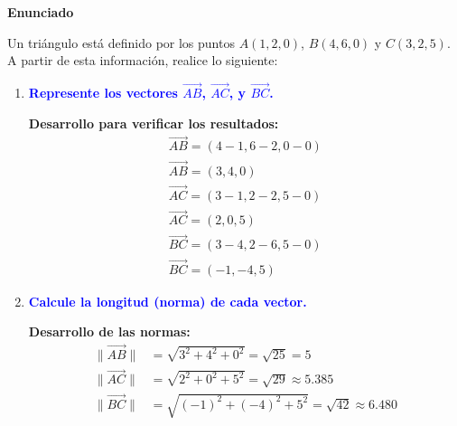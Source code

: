 
\begin{center}
\colorbox{gray!10}{\parbox{0.95\textwidth}{
\vspace{0.3cm}
\centering
\textbf{\large Enunciado}
\vspace{0.2cm}

\begin{minipage}{0.9\textwidth}
Un triángulo está definido por los puntos $A(1,2,0)$, $B(4,6,0)$ y $C(3,2,5)$. A partir de esta información, realice lo siguiente:
\end{minipage}
\vspace{0.3cm}
}}
\end{center}

\begin{enumerate}[label=\textbf{\arabic*.}, itemsep=1em, leftmargin=2em]
    \item \textcolor{blue}{\textbf{Represente los vectores $\overrightarrow{AB}$, $\overrightarrow{AC}$, y $\overrightarrow{BC}$.}}

    \begin{center}
    \colorbox{blue!5}{\begin{minipage}{0.9\textwidth}
    \vspace{0.3cm}
    \textbf{Desarrollo para verificar los resultados:}
    \begin{gather*}
        \overrightarrow{AB} = (4-1,  6-2, 0-0) \\
        \overrightarrow{AB} = \boxed{(3, 4, 0)} \\[0.5em]
        \overrightarrow{AC} = (3-1,  2-2,  5-0) \\
        \overrightarrow{AC} = \boxed{(2, 0, 5)} \\[0.5em]
        \overrightarrow{BC} = (3-4,2-6,5-0) \\
        \overrightarrow{BC} = \boxed{(-1, -4, 5)}
    \end{gather*}
    \vspace{0.2cm}
    \end{minipage}}
    \end{center}
    
    \item \textcolor{blue}{\textbf{Calcule la longitud (norma) de cada vector.}}
    
    \begin{center}
    \colorbox{green!5}{\begin{minipage}{0.9\textwidth}
    \vspace{0.3cm}
    \textbf{Desarrollo de las normas:}
    \begin{align*}
        \|\vec{AB}\| &= \sqrt{3^2 + 4^2 + 0^2} = \sqrt{25} = \boxed{5} \\[0.8em]
        \|\vec{AC}\| &= \sqrt{2^2 + 0^2 + 5^2} = \sqrt{29} \approx \boxed{5.385} \\[0.8em]
        \|\vec{BC}\| &= \sqrt{(-1)^2 + (-4)^2 + 5^2} = \sqrt{42} \approx \boxed{6.480}
    \end{align*}
    \vspace{0.2cm}
    \end{minipage}}
    \end{center}
    

\end{enumerate}
